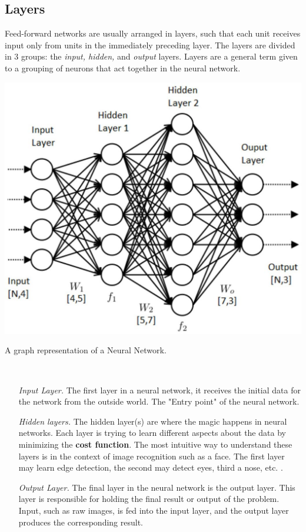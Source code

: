 \documentclass[nobib]{tufte-handout} %
\begin{document}
\subsection{Layers}
\label{sub:Layers}
Feed-forward networks are usually arranged in layers, such that each unit receives input
only from units in the immediately preceding layer. The layers are divided in 3 groups: the \textit{input, hidden,} and \textit{output} layers. Layers are a general term given to a grouping of neurons that act together in the neural network.
\begin{marginfigure}\label{this}
  \includegraphics{NeuralNetwork}
  \caption{A graph representation of a Neural Network.}
\end{marginfigure}
\begin{definition}[Layers] $  $
  \begin{enumerate}
    \item[\it Input Layer.] The first layer in a neural network, it receives the initial data for the network from the outside world. The "Entry point" of the neural network.
    \item[\it Hidden layers.] The hidden layer(s) are where the magic happens in neural networks. Each layer is trying to learn different aspects about the data by minimizing the \textbf{cost function}. The most intuitive way to understand these layers is in the context of image recognition such as a face. The first layer may learn edge detection, the second may detect eyes, third a nose, etc. \citep{layers}.
    \item[\it Output Layer.] The final layer in the neural network is the output layer. This layer is responsible for holding the final result or output of the problem. Input, such as raw images, is fed into the input layer, and the output layer produces the corresponding result.
\end{enumerate}

\end{definition}
\end{document}
